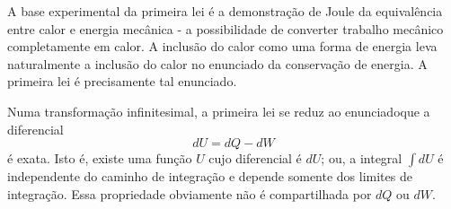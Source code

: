 A base experimental da primeira lei \'e a demonstra\c{c}\~ao de Joule da equival\^encia entre calor e energia mec\^anica - a possibilidade de converter trabalho mec\^anico completamente em calor. A inclus\~ao do calor como uma forma de energia leva naturalmente a inclus\~ao do calor no enunciado da conserva\c{c}\~ao de energia. A primeira lei \'e precisamente tal enunciado.

Numa transforma\c{c}\~ao infinitesimal, a primeira lei se reduz ao enunciadoque a diferencial
\begin{equation}
dU=dQ-dW
\end{equation}
\'e exata. Isto \'e, existe uma fun\c{c}\~ao $U$ cujo diferencial \'e $dU$; ou, a integral $\int dU$ \'e independente do caminho de integra\c{c}\~ao e depende somente dos limites de integra\c{c}\~ao. Essa propriedade obviamente n\~ao \'e compartilhada por $dQ$ ou $dW$.